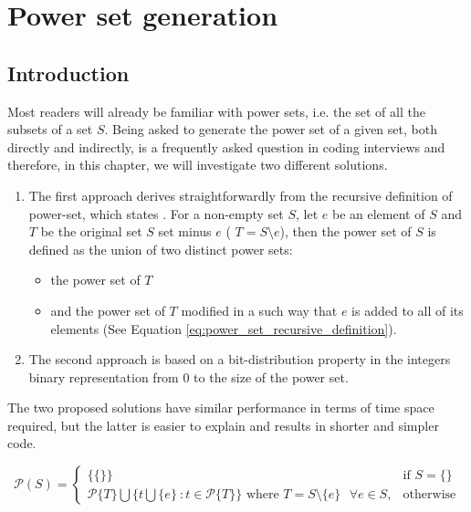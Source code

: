 %


\chapter{Power set generation}
\label{ch:power_set}
\section*{Introduction}

Most readers will already be familiar with power sets, i.e.  the set of all the subsets of a set $S$.  Being asked to generate the power set of a given set, both directly and indirectly, is a frequently asked question in coding interviews and therefore, in this chapter, we will investigate  two different solutions.  

\begin{enumerate}
    \item The first approach derives straightforwardly from the recursive definition of power-set, which states . 
    For a non-empty set $S$, let $e$ be an element of $S$ and $T$ be the original set $S$ set minus $e$ ( $T=S \setminus e$), then the power set of $S$ is defined as the union of two distinct power sets:
    \begin{itemize}
        \item   the power set of $T$
        \item   and the power set of $T$ modified in a such way that $e$ is added to all of its elements (See Equation \ref{eq:power_set_recursive_definition}).  
    \end{itemize}
    \item The second approach is based on a bit-distribution property in the integers binary representation from $0$ to the size of the power set.

\end{enumerate}

The two proposed solutions have similar performance in terms of time space required, but the latter is easier to explain and results in shorter and simpler code. 

\begin{equation}
    \mathcal{P}(S)=\begin{cases} 
    \{\{\}\} & \text{if } S=\{\} \\
    \mathcal{P}\{T\} \bigcup \{t \bigcup \{e\} \: : t \in \mathcal{P}\{T\}\} \text{ where }  T = S \setminus \{e\} \text{ } \forall e \in S, & \text{otherwise}
    \end{cases}
    \label{eq:power_set_recursive_definition}
\end{equation}



